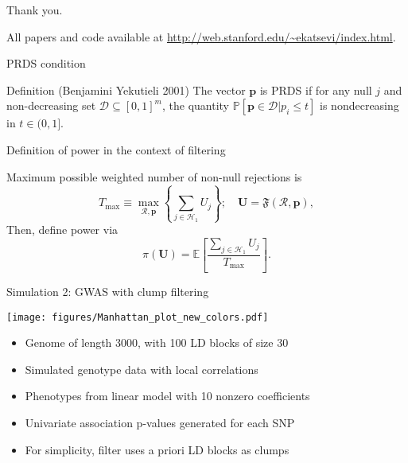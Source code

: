\documentclass{beamer}
\begin{document}
\begin{frame}

{
\Huge
\begin{center}
\textcolor{beamer@blendedblue}{Thank you.}
\end{center}
}

\vspace{0.1in}

\centering
All papers and code available at \url{http://web.stanford.edu/~ekatsevi/index.html}.
	
	
\end{frame}

\appendix

\begin{frame}{PRDS condition}

\begin{block}{Definition (Benjamini Yekutieli 2001)}
The vector $\bm p$ is PRDS if for any null $j$ and non-decreasing set $\mathcal D \subseteq [0,1]^m$, the quantity $\mathbb P[\bm p \in \mathcal D | p_i \leq t]$ is nondecreasing in $t \in (0,1]$.
\end{block}

\end{frame}

\begin{frame}{Definition of power in the context of filtering}
	
	Maximum possible weighted number of non-null rejections is
	\begin{equation*}
	T_{\max} \equiv \max_{\mathcal R, \bm p} \left\{\sum_{j \in \mathcal H_1} U_j\right\}; \quad \bm U = \mathfrak F(\mathcal R, \bm p),
	\label{tmax}
	\end{equation*}
	Then, define power via
	\begin{equation*}
	\pi(\bm U) = \mathbb E\left[\frac{\sum_{j \in \mathcal H_1} U_j}{T_{\max}}\right].
	\end{equation*}
	
\end{frame}


\begin{frame}{Simulation 2: GWAS with clump filtering}
	
	\begin{center}
		\texttt{[image: figures/Manhattan\_plot\_new\_colors.pdf]}
	\end{center}
	\vspace{-0.1in}
	
	\begin{itemize}
		\item Genome of length 3000, with 100 LD blocks of size 30
		\item Simulated genotype data with local correlations
		\item Phenotypes from linear model with 10 nonzero coefficients
		\item Univariate association p-values generated for each SNP 
		\item For simplicity, filter uses a priori LD blocks as clumps
	\end{itemize}
\end{frame}
\end{document}
